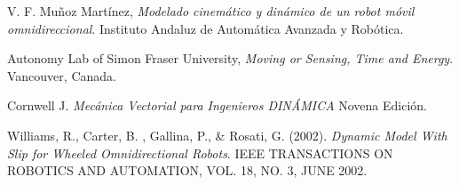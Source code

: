 \documentclass[12pt,letterpaper]{report} %
\begin{document}
\begin{thebibliography}{}
 V. F. Muñoz Martínez, \emph{Modelado cinemático y dinámico de un robot móvil omnidireccional}. Instituto Andaluz de Automática Avanzada y Robótica.

 Autonomy Lab of Simon Fraser University, \emph{Moving or Sensing, Time and Energy}. Vancouver, Canada.

  Cornwell J. \emph{Mecánica Vectorial para Ingenieros DINÁMICA} Novena Edición.

 Williams, R., Carter, B. , Gallina,  P., \& Rosati, G. (2002). \emph{Dynamic Model With Slip for Wheeled Omnidirectional Robots}. IEEE TRANSACTIONS ON ROBOTICS AND AUTOMATION, VOL. 18, NO. 3, JUNE 2002. 


\end{thebibliography}
\end{document}

